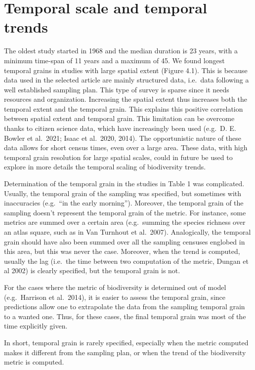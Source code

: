\documentclass[
  12pt,
  oneside]{report}
\begin{document}
\hypertarget{temporal-scale-and-temporal-trends}{%
\chapter{Temporal scale and temporal trends}\label{temporal-scale-and-temporal-trends}}

The oldest study started in 1968 and the median duration is 23 years, with a minimum time-span of 11 years and a maximum of 45. We found longest temporal grains in studies with large spatial extent (Figure 4.1). This is because data used in the selected article are mainly structured data, i.e.~data following a well established sampling plan. This type of survey is sparse since it needs resources and organization. Increasing the spatial extent thus increases both the temporal extent and the temporal grain. This explains this positive correlation between spatial extent and temporal grain. This limitation can be overcome thanks to citizen science data, which have increasingly been used (e.g.~D. E. Bowler et al.~2021; Isaac et al.~2020, 2014). The opportunistic nature of these data allows for short census times, even over a large area. These data, with high temporal grain resolution for large spatial scales, could in future be used to explore in more details the temporal scaling of biodiversity trends.

Determination of the temporal grain in the studies in Table 1 was complicated. Usually, the temporal grain of the sampling was specified, but sometimes with inaccuracies (e.g.~``in the early morning''). Moreover, the temporal grain of the sampling doesn't represent the temporal grain of the metric. For instance, some metrics are summed over a certain area (e.g.~summing the species richness over an atlas square, such as in Van Turnhout et al.~2007). Analogically, the temporal grain should have also been summed over all the sampling censuses englobed in this area, but this was never the case. Moreover, when the trend is computed, usually the lag (i.e.~the time between two computation of the metric, Dungan et al 2002) is clearly specified, but the temporal grain is not.

For the cases where the metric of biodiversity is determined out of model (e.g.~Harrison et al.~2014), it is easier to assess the temporal grain, since predictions allow one to extrapolate the data from the sampling temporal grain to a wanted one. Thus, for these cases, the final temporal grain was most of the time explicitly given.

In short, temporal grain is rarely specified, especially when the metric computed makes it different from the sampling plan, or when the trend of the biodiversity metric is computed.
\end{document}

